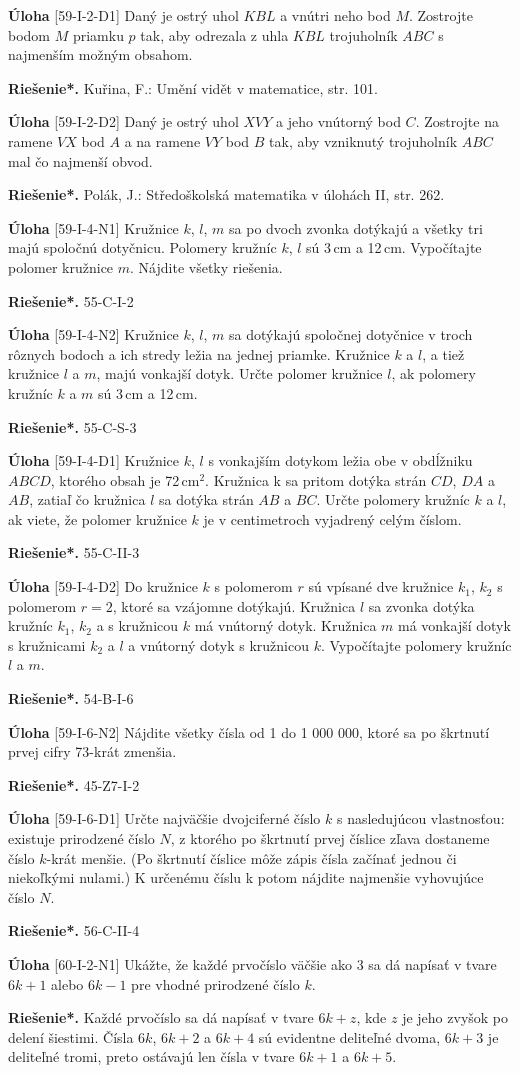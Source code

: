 \documentclass{article}
\newcommand{\rieh}{\textbf{Riešenie*.} }
\newcommand{\problem}[3]{
  \begin{tcolorbox}[breakable,notitle,boxrule=0pt,colback=light-gray,colframe=light-gray]
    \textbf{Úloha}
    [#1] #2
  \end{tcolorbox}
  \noindent#3
}
\begin{document}
\problem{59-I-2-D1}{
Daný je ostrý uhol $KBL$ a vnútri neho bod $M$. Zostrojte bodom $M$ priamku $p$ tak, aby odrezala z uhla $KBL$ trojuholník $ABC$ s najmenším možným obsahom. 
}{
\rieh Kuřina, F.: Umění vidět v matematice, str. 101.
}


\problem{59-I-2-D2}{
Daný je ostrý uhol $XVY$ a jeho vnútorný bod $C$. Zostrojte na ramene $VX$ bod $A$ a na ramene $VY$ bod $B$ tak, aby vzniknutý trojuholník $ABC$ mal čo najmenší obvod.
}{
\rieh 
Polák, J.: Středoškolská matematika v úlohách II, str. 262.
}


\problem{59-I-4-N1}{
Kružnice $k$, $l$, $m$ sa po dvoch zvonka dotýkajú a všetky tri majú spoločnú dotyčnicu.
Polomery kružníc $k$, $l$ sú 3\,cm a 12\,cm. Vypočítajte polomer kružnice $m$. Nájdite všetky riešenia.
}{
\rieh 55-C-I-2
}

\problem{59-I-4-N2}{
Kružnice $k$, $l$, $m$ sa dotýkajú spoločnej dotyčnice v troch rôznych bodoch a ich stredy
ležia na jednej priamke. Kružnice $k$ a $l$, a tiež kružnice $l$ a $m$, majú vonkajší dotyk.
Určte polomer kružnice $l$, ak polomery kružníc $k$ a $m$ sú 3\,cm a 12\,cm.
}{
\rieh 55-C-S-3
}


\problem{59-I-4-D1}{
Kružnice $k$, $l$ s vonkajším dotykom ležia obe v obdĺžniku $ABCD$, ktorého obsah je
72\,cm$^2$. Kružnica k sa pritom dotýka strán $CD$, $DA$ a $AB$, zatiaľ čo kružnica $l$ sa
dotýka strán $AB$ a $BC$. Určte polomery kružníc $k$ a $l$, ak viete, že polomer kružnice $k$ je v centimetroch vyjadrený celým číslom.
}{
\rieh 55-C-II-3
}

\problem{59-I-4-D2}{
Do kružnice $k$ s polomerom $r$ sú vpísané dve kružnice $k_1$, $k_2$ s polomerom $r=2$, ktoré
sa vzájomne dotýkajú. Kružnica $l$ sa zvonka dotýka kružníc $k_1$, $k_2$ a s kružnicou $k$ má vnútorný dotyk. Kružnica $m$ má vonkajší dotyk s kružnicami $k_2$ a $l$ a vnútorný dotyk s kružnicou $k$. Vypočítajte polomery kružníc $l$ a $m$.
}{
\rieh 54-B-I-6
}


\problem{59-I-6-N2}{
Nájdite všetky čísla od 1 do 1 000 000, ktoré sa po škrtnutí prvej cifry 73-krát zmenšia.
}{
\rieh 45-Z7-I-2
}


\problem{59-I-6-D1}{
Určte najväčšie dvojciferné číslo $k$ s nasledujúcou vlastnosťou: existuje prirodzené
číslo $N$, z ktorého po škrtnutí prvej číslice zľava dostaneme číslo $k$-krát menšie. (Po
škrtnutí číslice môže zápis čísla začínať jednou či niekoľkými nulami.) K určenému
číslu k potom nájdite najmenšie vyhovujúce číslo $N$. 
}{
\rieh 56-C-II-4
}

\problem{60-I-2-N1}{
Ukážte, že každé prvočíslo väčšie ako 3 sa dá napísať v tvare $6k + 1$ alebo $6k - 1$ pre
vhodné prirodzené číslo $k$.
}{
\rieh Každé prvočíslo sa dá napísať v tvare $6k + z$, kde $z$ je jeho zvyšok po delení šiestimi. Čísla $6k$, $6k +2$ a $6k +4$ sú evidentne deliteľné dvoma, $6k +3$ je deliteľné tromi, preto ostávajú len čísla v tvare $6k + 1$ a $6k + 5$.
}
\end{document}
